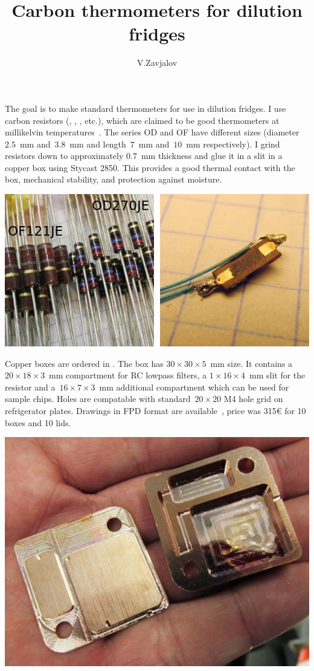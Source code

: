 \documentclass[a4paper]{article}
\title{Carbon thermometers for dilution fridges}
\author{V.Zavjalov}
\begin{document}
\maketitle

The goal is to make standard thermometers for use in dilution fridges. I
use carbon \Ohmite{} resistors (\OhmiteOFOD{}, ,
,  etc.), which are claimed to be
good thermometers at millikelvin temperatures~\cite{therm_paper}. The
series OD and OF have different sizes (diameter $2.5$~mm and~$3.8$~mm and
length~$7$~mm and~$10$~mm respectively). I grind resistors down to
approximately $0.7$~mm thickness and glue it in a slit in a copper box
using Stycast 2850. This provides a good thermal contact with the box,
mechanical stability, and protection against moisture.

\begin{center}
\includegraphics[width=\linewidth]{img/res.jpg}
\end{center}

Copper boxes are ordered in \SchaefferAG.  The
box has $30\times30\times5$~mm size. It contains a~$20\times18\times3$~mm
compartment for RC lowpass filters, a $1\times16\times4$~mm slit for the
resistor and a~$16\times7\times3$~mm additional compartment which can be
used for sample chips. Holes are compatable with standard~$20\times20$ M4
hole grid on \BlueFors{} refrigerator plates. Drawings in FPD format are
available~\cite{box_drawings}, price was 315\euro{} for 10 boxes and 10
lids.

\begin{center}
\includegraphics[width=\linewidth]{img/box.jpg}
\end{center}
\end{document}
